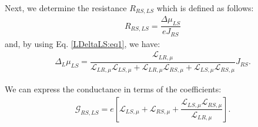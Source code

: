 

Next, we determine the resistance $R_{RS,LS}$ which is defined as follows:
\begin{align*}
R_{RS,LS}=\dfrac{\Delta\mu_{LS}}{eJ_{RS}}
\end{align*}
and, by using Eq. \eqref{LDeltaLS:eq1}, we have:
\begin{align*}
\Delta_{L}\mu_{LS}
=
\dfrac{\mathcal{L}_{LR,\mu}}{\mathcal{L}_{LR,\mu} \mathcal{L}_{LS,\mu} +\mathcal{L}_{LR,\mu} \mathcal{L}_{RS,\mu}+\mathcal{L}_{LS,\mu} \mathcal{L}_{RS,\mu}}J_{RS}.
\end{align*}

We can express the conductance in terms of the coefficients:
\begin{align}\label{GRSLS:eq1}
\mathcal{G}_{RS,LS}=e\left[\mathcal{L}_{LS,\mu}+\mathcal{L}_{RS,\mu}+\dfrac{\mathcal{L}_{LS,\mu} \mathcal{L}_{RS,\mu}}{\mathcal{L}_{LR,\mu}}\right].
\end{align}


